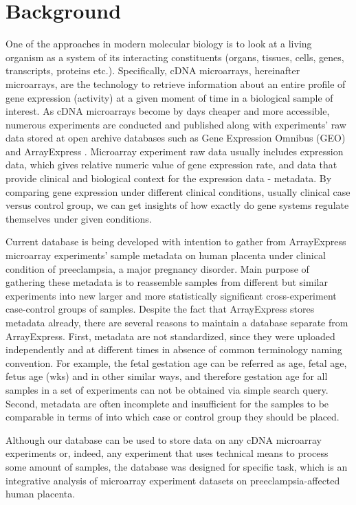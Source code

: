 \documentclass[conference]{IEEEtran}
\begin{document}
\section{Background}

One of the approaches in modern molecular biology is to look at a living organism as a system of its interacting constituents (organs, tissues, cells, genes, transcripts, proteins etc.). Specifically, cDNA microarrays, hereinafter microarrays, are the technology to retrieve information about an entire profile of gene expression (activity) at a given moment of time in a biological sample of interest. As cDNA microarrays become by days cheaper and more accessible, numerous experiments are conducted and published along with experiments' raw data stored at open archive databases such as Gene Expression Omnibus (GEO) \cite{Barrett2011NCBIOn.} and ArrayExpress \cite{Rustici2013ArrayExpressTools.}. Microarray experiment raw data usually includes expression data, which gives relative numeric value of gene expression rate, and data that provide clinical and biological context for the expression data - metadata. By comparing gene expression under different clinical conditions, usually clinical case versus control group, we can get insights of how exactly do gene systems regulate themselves under given conditions.

Current database is being developed with intention to gather from ArrayExpress microarray experiments' sample metadata on human placenta under clinical condition of preeclampsia, a major pregnancy disorder. Main purpose of gathering these metadata is to reassemble samples from different but similar experiments into new larger and more statistically significant cross-experiment case-control groups of samples. Despite the fact that ArrayExpress stores metadata already, there are several reasons to maintain a database separate from ArrayExpress. First, metadata are not standardized, since they were uploaded independently and at different times in absence of common terminology naming convention. For example, the fetal gestation age can be referred as age, fetal age, fetus age (wks) and in other similar ways, and therefore gestation age for all samples in a set of experiments can not be obtained via simple search query. Second, metadata are often incomplete and insufficient for the samples to be comparable in terms of into which case or control group they should be placed.

Although our database can be used to store data on any cDNA microarray experiments or, indeed, any experiment that uses technical means to process some amount of samples, the database was designed for specific task, which is an integrative analysis of microarray experiment datasets on preeclampsia-affected human placenta.
\end{document}
